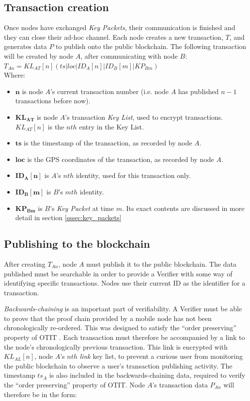 \subsection{Transaction creation}
Once nodes have exchanged \textit{Key Packets}, their communication is finished and they can close their ad-hoc channel. Each node creates a new transaction, $T$, and generates data $P$ to publish onto the public blockchain. The following transaction will be created by node $A$, after communicating with node $B$:
\\

$T_{An} = KL_{AT}[n](ts|loc|ID_{A}[n]|ID_{B}[m]|KP_{Bm})$
\\

Where:
\begin{itemize}[noitemsep,topsep=0pt]
	\item[] $\mathbf{n}$ is node $A$'s current transaction number (i.e. node $A$ has published $n-1$ transactions before now).
	\item[] $\mathbf{KL_{AT}}$ is node $A$'s transaction \textit{Key List}, used to encrypt transactions. $KL_{AT}[n]$ is the $nth$ entry in the Key List.
	\item[] $\mathbf{ts}$ is the timestamp of the transaction, as recorded by node $A$.
	\item[] $\mathbf{loc}$ is the GPS coordinates of the transaction, as recorded by node $A$.
	\item[] $\mathbf{ID_{A}[n]}$ is $A$'s $nth$ identity, used for this transaction only.
	\item[] $\mathbf{ID_{B}[m]}$ is $B$'s $mth$ identity.
	\item[] $\mathbf{KP_{Bm}}$ is $B$'s \textit{Key Packet} at time $m$. Its exact contents are discussed in more detail in section \ref{sssec:key_packets}
\end{itemize}

\subsection{Publishing to the blockchain}
After creating $T_{An}$, node $A$ must publish it to the public blockchain. The data published must be searchable in order to provide a Verifier with some way of identifying specific transactions. Nodes use their current ID as the identifier for a transaction.

\textit{Backwards-chaining} is an important part of verifiability. A Verifier must be able to prove that the proof chain provided by a mobile node has not been chronologically re-ordered. This was designed to satisfy the ``order preserving'' property of OTIT \cite{otit}. Each transaction must therefore be accompanied by a link to the node's chronologically previous transaction. This link is encrypted with $KL_{AL}[n]$, node $A$'s $nth$ \textit{link} key list, to prevent a curious user from monitoring the public blockchain to observe a user's transaction publishing activity. The timestamp $ts_A$ is also included in the backwards-chaining data, required to verify the ``order preserving'' property of OTIT. Node $A$'s transaction data $P_{An}$ will therefore be in the form:
\\

